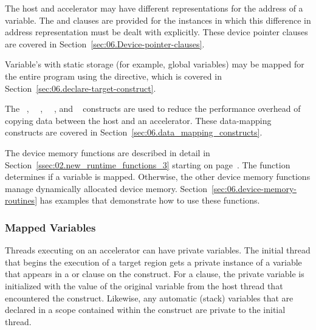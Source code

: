 The host and accelerator may have different representations for the address of
a variable.  The  and  clauses are
provided for the instances in which this difference in address representation
must be dealt with explicitly.  These device pointer clauses are covered in
Section~\ref{sec:06.Device-pointer-clauses}.

Variable's with static storage (for example, global variables) may be mapped
for the entire program using the  directive, which is
covered in Section~\ref{sec:06.declare-target-construct}.

The ~, ~~,
~~, and ~
constructs are used to reduce the performance overhead of copying data between
the host and an accelerator.  These data-mapping constructs are
covered in Section~\ref{sec:06.data_mapping_constructs}.

The device memory functions are described in detail in
Section~\ref{ssec:02.new_runtime_functions_3} starting on
page~\pageref{ssec:02.new_runtime_functions_3}.  
The  function determines if a variable
is mapped.  Otherwise, the other device memory functions 
manage dynamically allocated device memory.  
Section~\ref{sec:06.device-memory-routines} has examples 
that demonstrate how to use these functions.

\subsubsection{Mapped Variables}
\label{ssec:06.mapped-variables}

Threads executing on an accelerator can have private variables.  The initial
thread that begins the execution of a target region gets a private instance of
a variable that appears in a  or  clause on the
 construct.  For a  clause, the private variable
is initialized with the value of the original variable from the host thread
that encountered the construct.  Likewise, any automatic (stack)
variables that are declared in a scope contained within the construct
are private to the initial thread.


